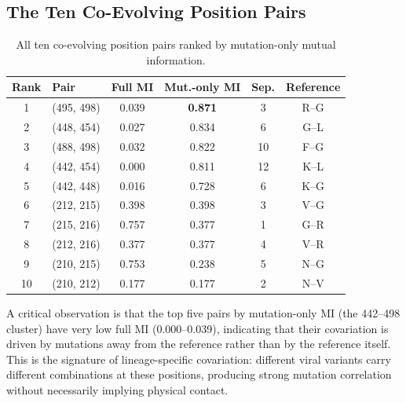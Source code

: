 \subsection{The Ten Co-Evolving Position Pairs}
\begin{table}[ht]
	\centering
	\caption{All ten co-evolving position pairs ranked by mutation-only mutual information.}
	\label{tab:spike-pairs}
	\begin{tabular}{clcccc}
		\toprule
		Rank & Pair       & Full MI & Mut.-only MI   & Sep. & Reference \\
		\midrule
		1    & (495, 498) & 0.039   & \textbf{0.871} & 3    & R--G      \\
		2    & (448, 454) & 0.027   & 0.834          & 6    & G--L      \\
		3    & (488, 498) & 0.032   & 0.822          & 10   & F--G      \\
		4    & (442, 454) & 0.000   & 0.811          & 12   & K--L      \\
		5    & (442, 448) & 0.016   & 0.728          & 6    & K--G      \\
		6    & (212, 215) & 0.398   & 0.398          & 3    & V--G      \\
		7    & (215, 216) & 0.757   & 0.377          & 1    & G--R      \\
		8    & (212, 216) & 0.377   & 0.377          & 4    & V--R      \\
		9    & (210, 215) & 0.753   & 0.238          & 5    & N--G      \\
		10   & (210, 212) & 0.177   & 0.177          & 2    & N--V      \\
		\bottomrule
	\end{tabular}
\end{table}

A critical observation is that the top five pairs by mutation-only MI (the
442--498 cluster) have very low full MI (0.000--0.039), indicating that their
covariation is driven by mutations away from the reference rather than by the
reference itself.  This is the signature of lineage-specific covariation:
different viral variants carry different combinations at these positions,
producing strong mutation correlation without necessarily implying physical
contact.

